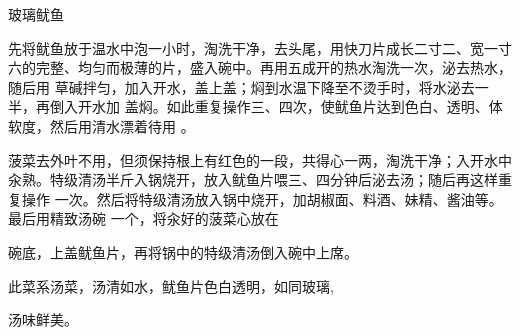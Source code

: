\begin{recipe}{玻璃鱿鱼}

\ingredients


\cooking

\step 先将鱿鱼放于温水中泡一小时，淘洗干净，去头尾，用快刀片成长二寸二、宽一寸
六的完整、均匀而极薄的片，盛入碗中。再用五成开的热水淘洗一次，泌去热水，随后用
草碱拌匀，加入开水，盖上盖；焖到水温下降至不烫手时，将水泌去一半，再倒入开水加
盖焖。如此重复操作三、四次，使鱿鱼片达到色白、透明、体软度，然后用清水漂着待用
。

\step 菠菜去外叶不用，但须保持根上有红色的一段，共得心一两，淘洗干净；入开水中
汆熟。特级清汤半斤入锅烧开，放入鱿鱼片喂三、四分钟后泌去汤；随后再这样重复操作
一次。然后将特级清汤放入锅中烧开，加胡椒面、料酒、妹精、酱油等。最后用精致汤碗
一个，将汆好的菠菜心放在

碗底，上盖鱿鱼片，再将锅中的特级清汤倒入碗中上席。

\features

此菜系汤菜，汤清如水，鱿鱼片色白透明，如同玻璃,

汤味鲜美。

\end{recipe}


